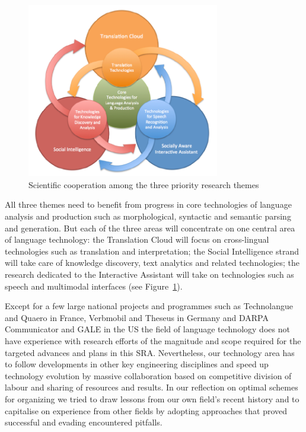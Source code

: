 \documentclass[10pt, plain]{../../metanetpaper}
\begin{document}
\begin{multicols}{2}
\begin{figure}[htb]
  \center
  \includegraphics[width=0.75\textwidth]{../_media/PT-Rings}
  \caption{Scientific cooperation among the three priority research themes}
  \label{fig:priority-themes}
\end{figure}
 
All three themes need to benefit from progress in core technologies of language analysis and production such as morphological, syntactic and semantic parsing and generation. But each of the three areas will concentrate on one central area of language technology: the Translation Cloud will focus on cross-lingual technologies such as translation and interpretation; the Social Intelligence strand will take care of knowledge discovery, text analytics and related technologies; the research dedicated to the Interactive Assistant will take on technologies such as speech and multimodal interfaces (see Figure~\ref{fig:priority-themes}).

Except for a few large national projects and programmes such as Technolangue and Quaero in France, Verbmobil and Theseus in Germany and DARPA Communicator and GALE in the US the field of language technology does not have experience with research efforts of the magnitude and scope required for the targeted advances and plans in this SRA. Nevertheless, our technology area has to follow developments in other key engineering disciplines and speed up technology evolution by massive collaboration based on competitive division of labour and sharing of resources and results. In our reflection on optimal schemes for organizing we tried to draw lessons from our own field's recent history and to capitalise on experience from other fields by adopting approaches that proved successful and evading encountered pitfalls.
 

\end{multicols}
\end{document}
